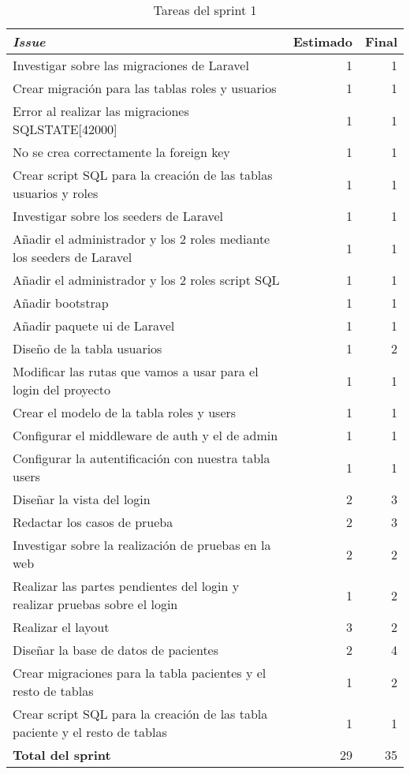\begin{table}[H]
	 \begin{tabularx}{\linewidth}{X r r}
	 	\toprule \textbf{\textit{Issue}} & \textbf{Estimado} & \textbf{Final}\\
	 	\toprule
	 	Investigar sobre las migraciones de Laravel  & 1 & 1 \\
	 	Crear migración para las tablas roles y usuarios & 1 & 1\\
	 	Error al realizar las migraciones SQLSTATE[42000] & 1 & 1 \\
	 	No se crea correctamente la foreign key & 1 & 1 \\
	 	Crear script SQL para la creación de las tablas usuarios y roles & 1 & 1 \\
	 	Investigar sobre los seeders de Laravel & 1 & 1 \\
	 	Añadir el administrador y los 2 roles mediante los seeders de Laravel & 1 & 1 \\
	 	Añadir el administrador y los 2 roles script SQL & 1 & 1 \\
	 	Añadir bootstrap & 1 & 1\\
	 	Añadir paquete ui de Laravel & 1 & 1 \\
	 	Diseño de la tabla usuarios & 1 & 2 \\
	 	Modificar las rutas que vamos a usar para el login del proyecto & 1 & 1 \\
	 	Crear el modelo de la tabla roles y users & 1 & 1 \\
	 	Configurar el middleware de auth y el de admin & 1 & 1 \\
	    Configurar la autentificación con nuestra tabla users & 1 & 1 \\
	 	Diseñar la vista del login & 2 & 3 \\
	 	Redactar los casos de prueba & 2 & 3 \\
	 	Investigar sobre la realización de pruebas en la web & 2 & 2 \\
	 	Realizar las partes pendientes del login y realizar pruebas sobre el login & 1 & 2 \\
	 	Realizar el layout & 3 & 2\\
	 	Diseñar la base de datos de pacientes & 2 & 4 \\
	 	Crear migraciones para la tabla pacientes y el resto de tablas & 1 & 2  \\
	 	Crear script SQL para la creación de las tabla paciente y el resto de tablas & 1 & 1 \\
	 	\midrule
	    \textbf{Total del sprint} & 29 & 35 \\
	 	\bottomrule
	 \end{tabularx}
	 \caption{Tareas del sprint 1}
\end{table}
